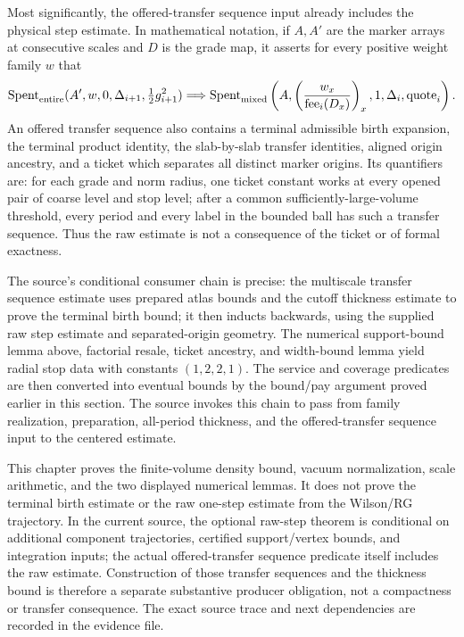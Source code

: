 Most significantly, the offered-transfer sequence input already includes the physical step estimate. In mathematical notation, if $A,A'$ are the marker arrays at consecutive scales and $D$ is the grade map, it asserts for every positive weight family $w$ that
\[
 \operatorname{Spent}_{\rm entire}(A',w,0,\Delta_{i+1},\tfrac12g_{i+1}^2)
 \Longrightarrow
 \operatorname{Spent}_{\rm mixed}
 \left(A,\left(\frac{w_x}{\operatorname{fee}_i(D_x)}\right)_x,
 1,\Delta_i,\operatorname{quote}_i\right).
\]
An offered transfer sequence also contains a terminal admissible birth expansion, the terminal product identity, the slab-by-slab transfer identities, aligned origin ancestry, and a ticket which separates all distinct marker origins. Its quantifiers are: for each grade and norm radius, one ticket constant works at every opened pair of coarse level and stop level; after a common sufficiently-large-volume threshold, every period and every label in the bounded ball has such a transfer sequence. Thus the raw estimate is not a consequence of the ticket or of formal exactness.

The source's conditional consumer chain is precise: the multiscale transfer sequence estimate uses prepared atlas bounds and the cutoff thickness estimate to prove the terminal birth bound; it then inducts backwards, using the supplied raw step estimate and separated-origin geometry. The numerical support-bound lemma above, factorial resale, ticket ancestry, and width-bound lemma yield radial stop data with constants $(1,2,2,1)$. The service and coverage predicates are then converted into eventual bounds by the bound/pay argument proved earlier in this section. The source invokes this chain to pass from family realization, preparation, all-period thickness, and the offered-transfer sequence input to the centered estimate.

This chapter proves the finite-volume density bound, vacuum normalization, scale arithmetic, and the two displayed numerical lemmas. It does not prove the terminal birth estimate or the raw one-step estimate from the Wilson/RG trajectory. In the current source, the optional raw-step theorem is conditional on additional component trajectories, certified support/vertex bounds, and integration inputs; the actual offered-transfer sequence predicate itself includes the raw estimate. Construction of those transfer sequences and the thickness bound is therefore a separate substantive producer obligation, not a compactness or transfer consequence. The exact source trace and next dependencies are recorded in the evidence file.
